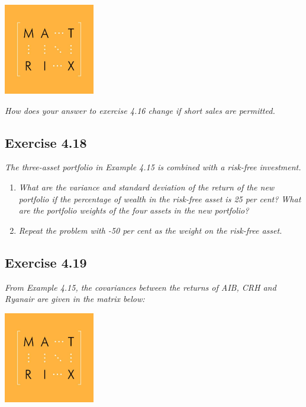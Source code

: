 \documentclass[]{book}
\theoremstyle{definition}
\theoremstyle{definition}
\theoremstyle{remark}
\begin{document}
\begin{center}\includegraphics[width=150px]{figures/matrix} \end{center}

\emph{How does your answer to exercise 4.16 change if short sales are
permitted.} \citep[p.118]{book}

\subsection{Exercise 4.18}\label{exercise-4.18}

\emph{The three-asset portfolio in Example 4.15 is combined with a
risk-free investment.} \citep[p.118]{book}

\begin{enumerate}
\def\labelenumi{\alph{enumi}.}
\item
  \emph{What are the variance and standard deviation of the return of
  the new portfolio if the percentage of wealth in the risk-free asset
  is 25 per cent? What are the portfolio weights of the four assets in
  the new portfolio?} \citep[p.118]{book}
\item
  \emph{Repeat the problem with -50 per cent as the weight on the
  risk-free asset.} \citep[p.118]{book}
\end{enumerate}

\subsection{Exercise 4.19}\label{exercise-4.19}

\emph{From Example 4.15, the covariances between the returns of AIB, CRH
and Ryanair are given in the matrix below:} \citep[p.119]{book}

\begin{center}\includegraphics[width=150px]{figures/matrix} \end{center}
\end{document}
